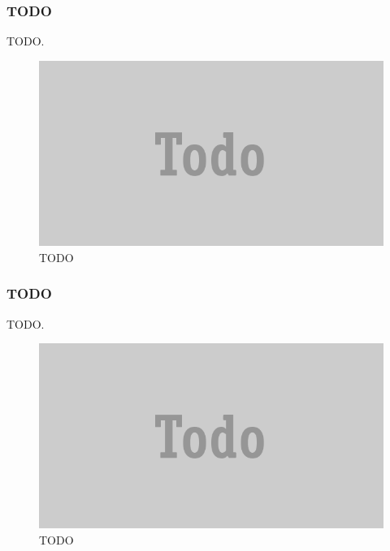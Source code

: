 \documentclass[JCDReport.tex]{subfiles}
\begin{document}
\subsubsection{TODO}
TODO.
\begin{figure}[h!]
	\centering
	\includegraphics[scale=1]{imageslukas/todo.png} 
	\caption{TODO}
\end{figure}

\subsubsection{TODO}
TODO.
\begin{figure}[h!]
	\centering
	\includegraphics[scale=1]{imageslukas/todo.png} 
	\caption{TODO}
\end{figure}

\end{document}
